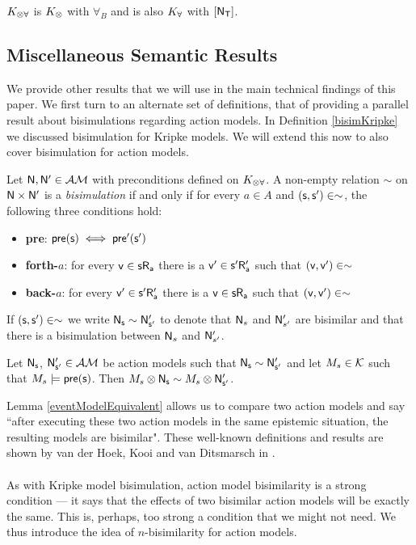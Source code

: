 $K_{\otimes\forall}$ is $K_{\otimes}$ with $\forall_B$ and is also $K_{\forall}$ with $[{\mathrm{\mathsf{N}}_\mathrm{\mathsf{T}}}]$.

\subsection{Miscellaneous Semantic Results}
We provide other results that we will use in the main technical findings of this paper.
We first turn to an alternate set of definitions, that of providing a parallel result about bisimulations regarding action models.
In Definition \ref{bisimKripke} we discussed bisimulation for Kripke models.
We will extend this now to also cover bisimulation for action models.

\begin{defn} \label{bisimEvent}
	Let $\mathrm{\mathsf{\mathrm{\mathsf{N}}, \mathrm{\mathsf{N}}'}} \in \mathcal{AM}$ with preconditions defined on $K_{\otimes\forall}$.
	A non-empty relation $\sim$ on $\mathrm{\mathsf{\mathrm{\mathsf{N}}}} \times \mathrm{\mathsf{\mathrm{\mathsf{N}}'}}$ is a {\em bisimulation} if and only if for every $a \in A$
	and $\mathrm{\mathsf{(s, s') \in \sim}}$, the following three conditions hold:
	\begin{itemize}
		\item {\bf pre}: $\mathrm{\mathsf{pre(s)}} \iff \mathrm{\mathsf{pre'(s')}}$
		\item {\bf forth-$a$}: for every $\mathrm{\mathsf{v \in s R_a}}$ there is a $\mathrm{\mathsf{v'
      \in s' R'_a}}$ such that $\mathrm{\mathsf{(v,v')}} \in \sim$
		\item {\bf back-$a$}: for every $\mathrm{\mathsf{v' \in s' R'_a}}$ there is a $\mathrm{\mathsf{v
      \in s R_a}}$ such that $\mathrm{\mathsf{(v,v')}} \in
		\sim$
	\end{itemize}
	If $\mathrm{\mathsf{(s, s') \in \sim}}$ we write $\mathrm{\mathsf{\mathrm{\mathsf{N}}_s \sim \mathrm{\mathsf{N}}'_{s'}}}$ to
  denote that $\mathrm{\mathsf{N}}_s$ and $\mathrm{\mathsf{N}}'_{s'}$ are bisimilar and
	that there is a bisimulation between $\mathrm{\mathsf{N}}_s$ and $\mathrm{\mathsf{N}}'_{s'}$.
\end{defn}

\begin{lemma} \label{eventModelEquivalent}
Let $\mathrm{\mathsf{\mathrm{\mathsf{N}}_s}}$, $\mathrm{\mathsf{\mathrm{\mathsf{N}}'_{s'}}} \in \mathcal{AM}$ be action models such that $\mathrm{\mathsf{\mathrm{\mathsf{N}}_s}}
\sim \mathrm{\mathsf{\mathrm{\mathsf{N}}'_{s'}}}$
and let $M_s \in \mathcal{K}$ such that $M_s \models \mathrm{\mathsf{pre(s)}}$.
Then $M_s \otimes \mathrm{\mathsf{\mathrm{\mathsf{N}}_s}} \sim M_s \otimes \mathrm{\mathsf{\mathrm{\mathsf{N}}'_{s'}}}$.
\end{lemma}

Lemma \ref{eventModelEquivalent} allows us to compare two action models and say ``after executing
these two action models in the same epistemic situation, the resulting models are bisimilar".
These well-known definitions and results are shown by van der Hoek, Kooi and van Ditsmarsch in
\cite{hoek2008dynamic}.\\
\\
As with Kripke model bisimulation, action model bisimilarity is a strong condition --- it says that the effects of two bisimilar
action models will be exactly the same.
This is, perhaps, too strong a condition that we might not need.
We thus introduce the idea of $n$-bisimilarity for action models.

